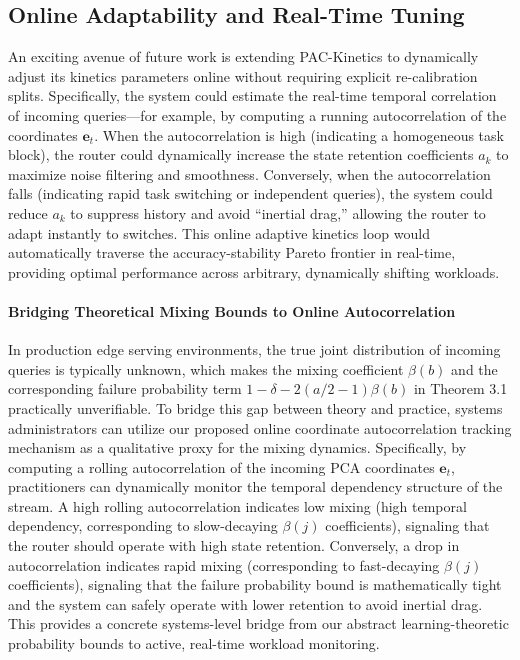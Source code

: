 \subsection{Online Adaptability and Real-Time Tuning}
An exciting avenue of future work is extending PAC-Kinetics to dynamically adjust its kinetics parameters online without requiring explicit re-calibration splits. Specifically, the system could estimate the real-time temporal correlation of incoming queries—for example, by computing a running autocorrelation of the coordinates $\mathbf{e}_t$. When the autocorrelation is high (indicating a homogeneous task block), the router could dynamically increase the state retention coefficients $a_k$ to maximize noise filtering and smoothness. Conversely, when the autocorrelation falls (indicating rapid task switching or independent queries), the system could reduce $a_k$ to suppress history and avoid ``inertial drag,'' allowing the router to adapt instantly to switches. This online adaptive kinetics loop would automatically traverse the accuracy-stability Pareto frontier in real-time, providing optimal performance across arbitrary, dynamically shifting workloads.

\paragraph{Bridging Theoretical Mixing Bounds to Online Autocorrelation} In production edge serving environments, the true joint distribution of incoming queries is typically unknown, which makes the mixing coefficient $\beta(b)$ and the corresponding failure probability term $1 - \delta - 2(a/2-1)\beta(b)$ in Theorem 3.1 practically unverifiable. To bridge this gap between theory and practice, systems administrators can utilize our proposed online coordinate autocorrelation tracking mechanism as a qualitative proxy for the mixing dynamics. Specifically, by computing a rolling autocorrelation of the incoming PCA coordinates $\mathbf{e}_t$, practitioners can dynamically monitor the temporal dependency structure of the stream. A high rolling autocorrelation indicates low mixing (high temporal dependency, corresponding to slow-decaying $\beta(j)$ coefficients), signaling that the router should operate with high state retention. Conversely, a drop in autocorrelation indicates rapid mixing (corresponding to fast-decaying $\beta(j)$ coefficients), signaling that the failure probability bound is mathematically tight and the system can safely operate with lower retention to avoid inertial drag. This provides a concrete systems-level bridge from our abstract learning-theoretic probability bounds to active, real-time workload monitoring.


